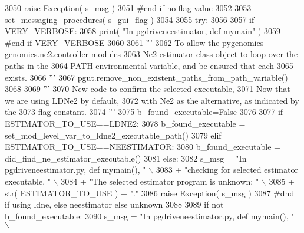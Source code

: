 \begin{DoxyCode}
3050         \textcolor{keywordflow}{raise} Exception( s\_msg )
3051     \textcolor{comment}{#end if no flag value}
3052 
3053     \hyperlink{namespacenegui_1_1pgdriveneestimator_a54013fc419eb559e07a5d278baa3fc6d}{set\_messaging\_procedures}( s\_gui\_flag )
3054 
3055     \textcolor{keywordflow}{try}:
3056 
3057         \textcolor{keywordflow}{if} VERY\_VERBOSE:
3058             print( \textcolor{stringliteral}{"In pgdriveneestimator, def mymain"} )
3059         \textcolor{comment}{#end if VERY\_VERBOSE}
3060 
3061         \textcolor{stringliteral}{'''}
3062 \textcolor{stringliteral}{        To allow the pygenomics genomics.ne2.controller modules}
3063 \textcolor{stringliteral}{        Ne2 estimator class object to loop over the paths in the}
3064 \textcolor{stringliteral}{        PATH environmental variable, and be ensured that each}
3065 \textcolor{stringliteral}{        exists.}
3066 \textcolor{stringliteral}{        '''}
3067         pgut.remove\_non\_existent\_paths\_from\_path\_variable()
3068 
3069         \textcolor{stringliteral}{'''}
3070 \textcolor{stringliteral}{        New code to confirm the selected executable,}
3071 \textcolor{stringliteral}{        Now that we are using LDNe2 by default,}
3072 \textcolor{stringliteral}{        with Ne2 as the alternative, as indicated by the}
3073 \textcolor{stringliteral}{        flag constant.}
3074 \textcolor{stringliteral}{        '''}
3075         b\_found\_executable=\textcolor{keyword}{False}
3076 
3077         \textcolor{keywordflow}{if} ESTIMATOR\_TO\_USE==LDNE2:
3078             b\_found\_executable = set\_mod\_level\_var\_to\_ldne2\_executable\_path()
3079         \textcolor{keywordflow}{elif} ESTIMATOR\_TO\_USE==NEESTIMATOR:
3080             b\_found\_executable = did\_find\_ne\_estimator\_executable()
3081         \textcolor{keywordflow}{else}:
3082             s\_msg = \textcolor{stringliteral}{"In pgdriveneestimator.py, def mymain(), "} \(\backslash\)
3083                             + \textcolor{stringliteral}{"checking for selected estimator executable. "} \(\backslash\)
3084                             + \textcolor{stringliteral}{"The selected estimator program is unknown: "} \(\backslash\)
3085                             + str( ESTIMATOR\_TO\_USE ) + \textcolor{stringliteral}{"."}
3086             \textcolor{keywordflow}{raise} Exception( s\_msg )
3087         \textcolor{comment}{#dnd if using ldne, else neestimator else unknown}
3088         
3089         \textcolor{keywordflow}{if} \textcolor{keywordflow}{not} b\_found\_executable:
3090             s\_msg = \textcolor{stringliteral}{"In pgdriveneestimator.py, def mymain(), "} \(\backslash\)

\end{DoxyCode}
